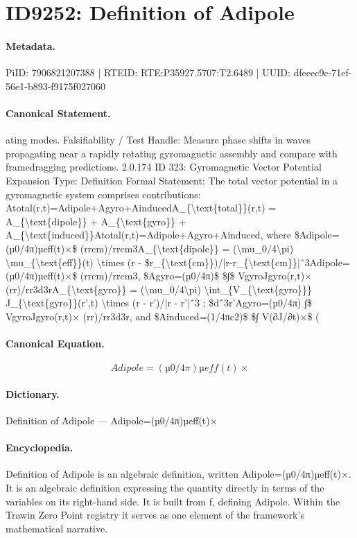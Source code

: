 \section*{ID9252: Definition of Adipole}
\paragraph{Metadata.}
PiID: 7906821207388 | RTEID: RTE:P35927.5707:T2.6489 | UUID: dfeeec9c-71ef-56e1-b893-f9175f027060

\paragraph{Canonical Statement.}
ating modes. Falsifiability / Test Handle: Measure phase shifts in waves propagating near a rapidly rotating gyromagnetic assembly and compare with framedragging predictions. 2.0.174 ID 323: Gyromagnetic Vector Potential Expansion Type: Definition Formal Statement: The total vector potential in a gyromagnetic system comprises contributions: Atotal(r,t)=Adipole+Agyro+AinducedA\_\{\textbackslash{}text\{total\}\}(r,t) = A\_\{\textbackslash{}text\{dipole\}\} + A\_\{\textbackslash{}text\{gyro\}\} + A\_\{\textbackslash{}text\{induced\}\}Atotal(r,t)=Adipole+Agyro+Ainduced, where \$Adipole=(µ0/4π)µeff(t)×\$ (rrcm)/rrcm3A\_\{\textbackslash{}text\{dipole\}\} = (\textbackslash{}mu\_0/4\textbackslash{}pi) \textbackslash{}mu\_\{\textbackslash{}text\{eff\}\}(t) \textbackslash{}times (r - \$r\_\{\textbackslash{}text\{cm\}\})/|r-r\_\{\textbackslash{}text\{cm\}\}|ˆ3Adipole=(µ0/4π)µeff(t)×\$ (rrcm)/rrcm3, \$Agyro=(µ0/4π)\$ \$∫\$ VgyroJgyro(r,t)× (rr)/rr3d3rA\_\{\textbackslash{}text\{gyro\}\} = (\textbackslash{}mu\_0/4\textbackslash{}pi) \textbackslash{}int\_\{V\_\{\textbackslash{}text\{gyro\}\}\} J\_\{\textbackslash{}text\{gyro\}\}(r’,t) \textbackslash{}times (r - r’)/|r - r’|ˆ3 ; \$dˆ3r’Agyro=(µ0/4π) ∫\$ VgyroJgyro(r,t)× (rr)/rr3d3r, and \$Ainduced=(1/4πc2)\$ \$∫ V(∂J/∂t)×\$ (

\paragraph{Canonical Equation.}
\[
Adipole=(µ0/4π)µeff(t)×
\]

\paragraph{Dictionary.}
Definition of Adipole — Adipole=(µ0/4π)µeff(t)×

\paragraph{Encyclopedia.}
Definition of Adipole is an algebraic definition, written Adipole=(µ0/4π)µeff(t)×. It is an algebraic definition expressing the quantity directly in terms of the variables on its right-hand side. It is built from f, defining Adipole. Within the Trawin Zero Point registry it serves as one element of the framework's mathematical narrative.
